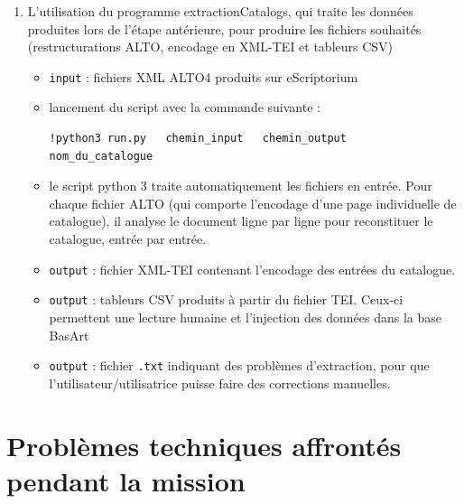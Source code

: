 \documentclass[a4paper,12pt,twoside]{book}
\begin{document}
\begin{enumerate}
	\item L'utilisation du programme extractionCatalogs, qui traite les données produites lors de l'étape antérieure, pour produire les fichiers souhaités (restructurations ALTO, encodage en XML-TEI et tableurs CSV)
	\begin{itemize}
		\item \texttt{input} : fichiers XML ALTO4 produits sur eScriptorium
		\item lancement du script avec la commande suivante :
		\begin{normalsize}
			\begin{verbatim}
!python3 run.py   chemin_input   chemin_output   nom_du_catalogue
			\end{verbatim}
		\end{normalsize}
		\item le script python 3 traite automatiquement les fichiers en entrée. Pour chaque fichier ALTO (qui comporte l'encodage d'une page individuelle de catalogue), il analyse le document ligne par ligne pour reconstituer le catalogue, entrée par entrée.
		\item \texttt{output} : fichier XML-TEI contenant l'encodage des entrées du catalogue.
		\item \texttt{output} : tableurs CSV produits à partir du fichier TEI. Ceux-ci permettent une lecture humaine et l'injection des données dans la base BasArt
		\item \texttt{output} : fichier \texttt{.txt} indiquant des problèmes d'extraction, pour que l'utilisateur/utilisatrice puisse faire des corrections manuelles.
	\end{itemize}
\end{enumerate}


\section{Problèmes techniques affrontés pendant la mission}
\end{document}
